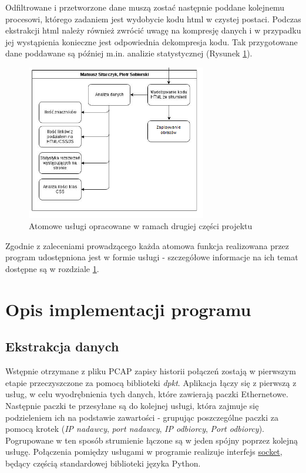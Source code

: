 \documentclass[12pt]{article}
\begin{document}
Odfiltrowane i przetworzone dane muszą zostać następnie poddane kolejnemu procesowi, którego zadaniem jest wydobycie kodu html w czystej postaci. Podczas ekstrakcji html należy również zwrócić uwagę na kompresję danych i w przypadku jej wystąpienia konieczne jest odpowiednia dekompresja kodu. 
Tak przygotowane dane poddawane są później m.in. analizie statystycznej (Rysunek \ref{img:funkcje2}). 

\begin{figure}[h]
\centering
\caption{Atomowe usługi opracowane w ramach drugiej części projektu}
\label{img:funkcje2}
\includegraphics[width=0.7\textwidth]{Wykres2.png}
\end{figure}


Zgodnie z zaleceniami prowadzącego każda atomowa funkcja realizowana przez program udostępniona jest w formie usługi - szczegółowe informacje na ich temat dostępne są w rozdziale \ref{dzialanie}. 

\section{Opis implementacji programu}
\label{dzialanie}
\subsection{Ekstrakcja danych}
Wstępnie otrzymane z pliku PCAP zapisy historii połączeń zostają w pierwszym etapie przeczyszczone za pomocą biblioteki \emph{dpkt}. Aplikacja łączy się z pierwszą z usług, w celu wyodrębnienia tych danych, które zawierają paczki Ethernetowe. Następnie paczki te przesyłane są do kolejnej usługi, która zajmuje się podzieleniem ich na podstawie zawartości - grupując poszczególne paczki za pomocą krotek (\emph{IP nadawcy}, \emph{port nadawcy}, \emph{IP odbiorcy}, \emph{Port odbiorcy}). Pogrupowane w ten sposób strumienie łączone są w jeden spójny poprzez kolejną usługę. Połączenia pomiędzy usługami w programie realizuje interfejs \href{https://docs.python.org/2/library/socket.html}{socket}, będący częścią standardowej biblioteki języka Python.
\end{document}
